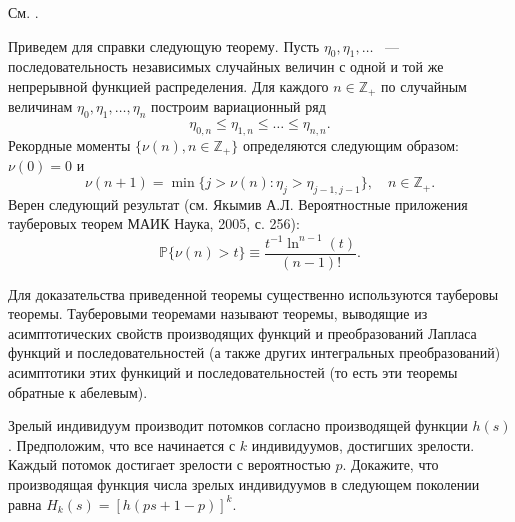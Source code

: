 \begin{ordre}
См. \cite{4}.
\end{ordre}

\begin{remark}
Приведем для справки следующую теорему. Пусть $\eta_0,\eta_1,\dots$ ~--- последовательность независимых случайных величин с одной и той же непрерывной функцией распределения. Для каждого $n\in \mathbb{Z}_{+}$ по случайным величинам $\eta_0,\eta_1,\dots,\eta_n$ построим вариационный ряд 
$$\eta_{0,n}\leq \eta_{1,n}\leq\dots\leq\eta_{n,n}.$$
Рекордные моменты $\{\nu(n),n\in\mathbb{Z}_{+}\}$ определяются следующим образом: $\nu(0) = 0$ и
$$\nu(n+1)=\min\{j>\nu(n): \eta_j>\eta_{j-1,j-1}\},\quad n\in \mathbb{Z}_{+}.$$
Верен следующий результат (см. Якымив А.Л. Вероятностные приложения тауберовых теорем МАИК Наука, 2005, с. 256):
$$\mathbb{P}\{\nu(n)>t\}\equiv \frac{t^{-1}\ln^{n-1}(t)}{(n-1)!}.$$

\medskip

Для доказательства приведенной теоремы существенно используются тауберовы теоремы.
Тауберовыми теоремами называют теоремы, выводящие из асимптотических свойств производящих функций и преобразований Лапласа функций и последовательностей  (а также других интегральных преобразований) асимптотики этих функиций и последовательностей (то есть эти теоремы обратные к абелевым). 
\end{remark}

\begin{problem}
Зрелый индивидуум производит потомков согласно производящей функции $h(s)$.
Предположим, что все начинается с $k$ индивидуумов, достигших зрелости. Каждый потомок достигает зрелости с вероятностью $p$. Докажите, что производящая функция числа зрелых индивидуумов в следующем поколении равна $H_k(s) = [h(ps + 1 - p)]^{k}$.   
\end{problem}

